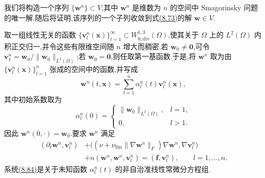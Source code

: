 \begin{note}[有限维问题的构造]
\label{note:smagorinsky-galerkin-setup}
我们将构造一个序列 $\{\bm{w}^n\}\subset V$,其中 $\bm{w}^n$ 是维数为 $n$ 的空间中 Smagorinsky 问题的唯一解.随后将证明,该序列的一个子列收敛到式\hyperref[eq:smagorinsky-weak-form]{(8.73)}的解 $\bm{w}\in V$.

取一组线性无关的函数 $\{\bm{v}_l^n(\bm{x})\}_{l=1}^\infty\subset W_{0,\mathrm{div}}^{1,3}(\Omega)$,使其关于 $\Omega$ 上的 $L^2(\Omega)$ 内积正交归一,并令这些有限维空间随 $n$ 增大而稠密.若 $\bm{w}_0\ne\bm{0}$,可令 $\bm{v}_1^n=\bm{w}_0/\|\bm{w}_0\|_{L^2(\Omega)}$;若 $\bm{w}_0=\bm{0}$,则任取第一基函数.于是,将 $\bm{w}^n$ 取为由 $\{\bm{v}_l^n(\bm{x})\}_{l=1}^{n}$ 张成的空间中的函数,并写成
\begin{equation}\label{eq:smagorinsky-galerkin-expansion}
 \bm{w}^n(t,\bm{x})
 =\sum_{l=1}^{n}\alpha_l^n(t)\bm{v}_l^n(\bm{x}),
\end{equation}
其中初始系数取为
\[
 \alpha_l^n(0)=
 \begin{cases}
  \|\bm{w}_0\|_{L^2(\Omega)},&l=1,\\
  0,&l>1.
 \end{cases}
\]
因此 $\bm{w}^n(0,\cdot)=\bm{w}_0$.要求 $\bm{w}^n$ 满足
\begin{equation}\label{eq:smagorinsky-galerkin-system}
\begin{aligned}
 (\partial_t\bm{w}^n,\bm{v}_l^n)
 &+\bigl((\nu+\nu_{\mathrm{Sm}}\|\nabla\bm{w}^n\|_F)
           \nabla\bm{w}^n,\nabla\bm{v}_l^n\bigr)\\
 &+n(\bm{w}^n,\bm{w}^n,\bm{v}_l^n)
   =(\bm{f},\bm{v}_l^n),
 \qquad l=1,\ldots,n.
\end{aligned}
\end{equation}
系统\hyperref[eq:smagorinsky-galerkin-system]{(8.84)}是关于未知函数 $\alpha_l^n(t)$ 的非自治准线性常微分方程组.
\end{note}

